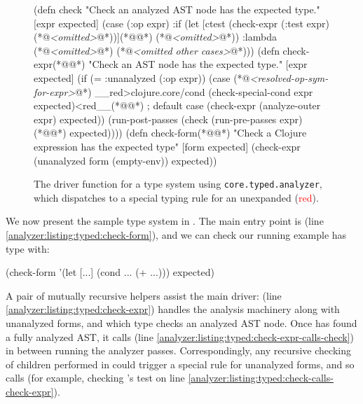 \begin{figure}
\lstset{numbers=left,xleftmargin=2em,framexleftmargin=1.5em}
\begin{cljlisting}
(defn check
  "Check an analyzed AST node has the expected type."
  [expr expected]
  (case (:op expr)
    :if (let [ctest (check-expr (:test expr) (*@\emph{<omitted>}@*))](*@\label{analyzer:listing:typed:check-calls-check-expr}@*)
          (*@\emph{<omitted>}@*))
    :lambda (*@\emph{<omitted>}@*)
    (*@\emph{<omitted other cases>}@*)))
(defn check-expr(*@\label{analyzer:listing:typed:check-expr}@*)
  "Check an AST node has the expected type."
  [expr expected]
  (if (= :unanalyzed (:op expr))
    (case (*@\emph{<resolved-op-sym-for-expr>}@*)
      __red>clojure.core/cond (check-special-cond expr expected)<red__(*@\label{analyzer:listing:typed:check-expr:special-cond}@*)
      ; default case
      (check-expr (analyze-outer expr) expected))
    (run-post-passes
      (check (run-pre-passes expr)(*@\label{analyzer:listing:typed:check-expr-calls-check}@*)
             expected))))
(defn check-form(*@\label{analyzer:listing:typed:check-form}@*)
  "Check a Clojure expression has the expected type"
  [form expected]
  (check-expr (unanalyzed form (empty-env))
              expected))
\end{cljlisting}
  \caption{The driver function  for a type system using \texttt{core.typed.analyzer},
  which dispatches to a special typing rule for an unexpanded  (\textcolor{red}{red}).}
  \label{fig:analyzer:core.typed.analyzer-driver}
\end{figure}

We now present the sample type system in .
The main entry point is  (line \ref{analyzer:listing:typed:check-form}),
and we can check our running example has type 
with:

\begin{cljlisting}
(check-form '(let [...] (cond ... (+ ...)))
            expected)
\end{cljlisting}

A pair of mutually recursive helpers assist the main driver:  (line \ref{analyzer:listing:typed:check-expr})
handles the analysis machinery along with unanalyzed forms,
and 
which type checks an analyzed AST node.
Once  has found a fully analyzed AST, it calls
 (line \ref{analyzer:listing:typed:check-expr-calls-check})
in between running the analyzer passes.
Correspondingly, any recursive checking of children performed in 
could trigger a special rule for unanalyzed forms, and so
calls  (for example, checking 's test on
line \ref{analyzer:listing:typed:check-calls-check-expr}).


